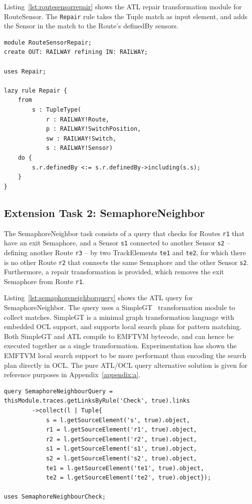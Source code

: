 \documentclass[submission,copyright,creativecommons]{eptcs}
\begin{document}
Listing~\ref{lst:routesensorrepair} shows the ATL repair transformation module for RouteSensor. The \texttt{Repair} rule takes the Tuple match as input element, and adds the Sensor in the match to the Route's definedBy sensors.

\lstset{language=atl}
\begin{lstlisting}[float=htb, caption={RouteSensor repair transformation module in ATL}, label=lst:routesensorrepair, captionpos=b, frame=tb, belowskip=-10pt]
module RouteSensorRepair;
create OUT: RAILWAY refining IN: RAILWAY;

uses Repair;

lazy rule Repair {
	from
		s : TupleType(
			r : RAILWAY!Route, 
			p : RAILWAY!SwitchPosition, 
			sw : RAILWAY!Switch,
			s : RAILWAY!Sensor)
	do {
		s.r.definedBy <:= s.r.definedBy->including(s.s);
	}
}
\end{lstlisting}

\subsection{Extension Task 2: SemaphoreNeighbor}

The SemaphoreNeighbor task consists of a query that checks for Routes \texttt{r1} that have an exit Semaphore, and a Sensor \texttt{s1} connected to another Sensor \texttt{s2} -- defining another Route \texttt{r3} -- by two TrackElements \texttt{te1} and \texttt{te2}, for which there is no other Route \texttt{r2} that connects the same Semaphore and the other Sensor \texttt{s2}. Furthermore, a repair transformation is provided, which removes the exit Semaphore from Route \texttt{r1}.

Listing~\ref{lst:semaphoreneighborquery} shows the ATL query for SemaphoreNeighbor. The query uses a SimpleGT~\cite{conf/models/Wagelaar2011} transformation module to collect matches. SimpleGT is a minimal graph transformation language with embedded OCL support, and supports local search plans for pattern matching. Both SimpleGT and ATL compile to EMFTVM bytecode, and can hence be executed together as a single transformation. Experimentation has shown the EMFTVM local search support to be more performant than encoding the search plan directly in OCL. The pure ATL/OCL query alternative solution is given for reference purposes in Appendix~\ref{appendix:a}.

\lstset{language=atl}
\begin{lstlisting}[float=htb, caption={SemaphoreNeighborQuery in ATL}, label=lst:semaphoreneighborquery, captionpos=b, frame=tb, belowskip=-10pt]
query SemaphoreNeighbourQuery = thisModule.traces.getLinksByRule('Check', true).links
		->collect(l | Tuple{
			s = l.getSourceElement('s', true).object,
			r1 = l.getSourceElement('r1', true).object,
			r2 = l.getSourceElement('r2', true).object,
			s1 = l.getSourceElement('s1', true).object,
			s2 = l.getSourceElement('s2', true).object,
			te1 = l.getSourceElement('te1', true).object,
			te2 = l.getSourceElement('te2', true).object});

uses SemaphoreNeighbourCheck;
\end{lstlisting}
\end{document}

